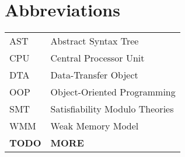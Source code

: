 \chapter*{Abbreviations}


\noindent
\begin{longtable}{@{}p{}p{}@{}}
AST & Abstract Syntax Tree \\
CPU & Central Processor Unit \\
DTA & Data-Transfer Object \\
OOP & Object-Oriented Programming \\
SMT & Satisfiability Modulo Theories \\
WMM & Weak Memory Model \\
\textbf{TODO} & \textbf{MORE}
\end{longtable}

